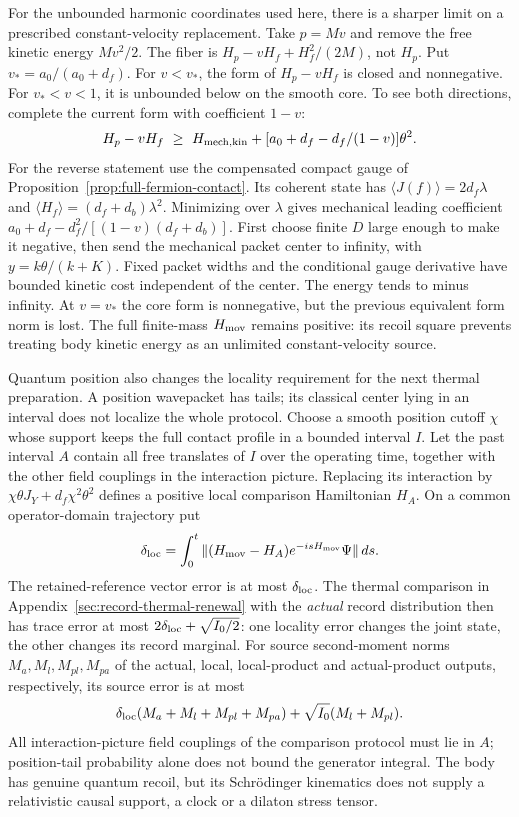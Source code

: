 For the unbounded harmonic coordinates used here, there is a sharper
limit on a prescribed constant-velocity replacement.
Take $p=Mv$ and remove the free kinetic energy $Mv^2/2$. The fiber
is $H_p-vH_f+H_f^2/(2M)$, not $H_p$.
Put $v_*=a_0/(a_0+d_f)$. For $v<v_*$, the form of $H_p-vH_f$
is closed and nonnegative. For $v_*<v<1$, it is unbounded below
on the smooth core. To see both directions, complete the current
form with coefficient $1-v$:
\[
 H_p-vH_f\ \ge\
 H_{\rm mech,kin}
   +[a_0+d_f-d_f/(1-v)]\theta^2.
\]
For the reverse statement use the compensated compact gauge of
Proposition~\ref{prop:full-fermion-contact}. Its coherent state
has $\langle J(f)\rangle=2d_f\lambda$ and
$\langle H_f\rangle=(d_f+d_b)\lambda^2$. Minimizing over
$\lambda$ gives mechanical leading coefficient
$a_0+d_f-d_f^2/[(1-v)(d_f+d_b)]$. First choose finite $D$ large
enough to make it negative, then send the mechanical packet center
to infinity, with $y=k\theta/(k+K)$. Fixed packet widths and the
conditional gauge derivative have bounded kinetic cost independent
of the center. The energy tends to minus infinity.
At $v=v_*$ the core form is nonnegative, but the previous equivalent
form norm is lost. The full finite-mass $H_{\rm mov}$ remains positive:
its recoil square prevents treating body kinetic energy as an unlimited
constant-velocity source.

Quantum position also changes the locality requirement for the next
thermal preparation. A position wavepacket has tails; its classical
center lying in an interval does not localize the whole protocol.
Choose a smooth position cutoff $\chi$ whose support keeps the full
contact profile in a bounded interval $I$. Let the past interval $A$
contain all free translates of $I$ over the operating time, together
with the other field couplings in the interaction picture. Replacing its interaction
by $\chi\theta J_Y+d_f\chi^2\theta^2$ defines a positive local
comparison Hamiltonian $H_A$. On a common operator-domain trajectory put
\[
 \delta_{\rm loc}=\int_0^t
   \|(H_{\rm mov}-H_A)e^{-isH_{\rm mov}}\Psi\|\,ds.
\]
The retained-reference vector error is at most $\delta_{\rm loc}$.
The thermal comparison in Appendix~\ref{sec:record-thermal-renewal}
with the \emph{actual} record distribution then has trace error at
most $2\delta_{\rm loc}+\sqrt{I_0/2}$: one locality error changes
the joint state, the other changes its record marginal. For source
second-moment norms $M_a,M_l,M_{pl},M_{pa}$ of the actual, local,
local-product and actual-product outputs, respectively, its source
error is at most
\[
 \delta_{\rm loc}(M_a+M_l+M_{pl}+M_{pa})
       +\sqrt{I_0}(M_l+M_{pl}).
\]
All interaction-picture field couplings of the comparison protocol
must lie in $A$;
position-tail probability alone does not bound the generator integral.
The body has genuine quantum recoil, but its Schr\"odinger kinematics
does not supply a relativistic causal support, a clock or a dilaton
stress tensor.

